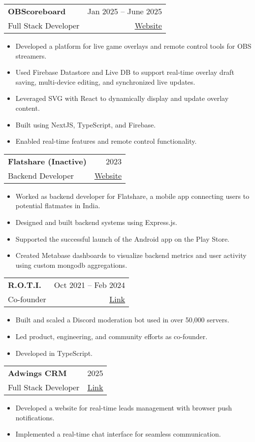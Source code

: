 \documentclass[A4,11pt]{article}
\makeatletter
\newcommand{\CVItem}[1]{
  \item\small{
    {#1 \vspace{-2pt}}
  }
}
\newcommand{\CVSubheading}[4]{
  \vspace{-2pt}\item
    \begin{tabular*}{0.97\textwidth}[t]{l@{\extracolsep{\fill}}r}
      \textbf{#1} & #2 \\
      \small#3 & \small #4 \\
    \end{tabular*}\vspace{-7pt}
}
\newcommand{\CVItemListStart}{\begin{itemize}}
\newcommand{\CVItemListEnd}{\end{itemize}\vspace{-5pt}}
\makeatother
\begin{document}
    \CVSubheading
      {OBScoreboard}{Jan 2025 -- June 2025}
      {Full Stack Developer}{\href{https://app.obscoreboard.com/}{\underline{\color{blue} Website}}}
      \CVItemListStart
        \CVItem{Developed a platform for live game overlays and remote control tools for OBS streamers.}
        \CVItem{Used Firebase Datastore and Live DB to support real-time overlay draft saving, multi-device editing, and synchronized live updates.}
        \CVItem{Leveraged SVG with React to dynamically display and update overlay content.}
        \CVItem{Built using NextJS, TypeScript, and Firebase.}
        \CVItem{Enabled real-time features and remote control functionality.}
      \CVItemListEnd

    \CVSubheading
      {Flatshare (Inactive)}{2023}
      {Backend Developer}{\href{https://joinflatshare.com/}{\underline{\color{blue} Website}}}
      \CVItemListStart
        \CVItem{Worked as backend developer for Flatshare, a mobile app connecting users to potential flatmates in India.}
        \CVItem{Designed and built backend systems using Express.js.}
        \CVItem{Supported the successful launch of the Android app on the Play Store.}
        \CVItem{Created Metabase dashboards to visualize backend metrics and user activity using custom mongodb aggregations.}
      \CVItemListEnd


      \CVSubheading
        {R.O.T.I.}{Oct 2021 -- Feb 2024}
        {Co-founder}{\href{https://rotibot.xyz/}{\underline{\color{blue} Link}}}
        \CVItemListStart
          \CVItem{Built and scaled a Discord moderation bot used in over 50,000 servers.}
          \CVItem{Led product, engineering, and community efforts as co-founder.}
          \CVItem{Developed in TypeScript.}
        \CVItemListEnd

      \CVSubheading
        {Adwings CRM}{2025}
        {Full Stack Developer}{\href{https://adwingscrm.com/}{\underline{\color{blue} Link}}}
        \CVItemListStart
          \CVItem{Developed a website for real-time leads management with browser push notifications.}
          \CVItem{Implemented a real-time chat interface for seamless communication.}
        \CVItemListEnd
\end{document}

